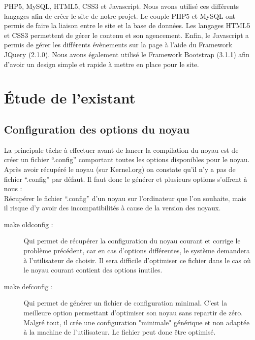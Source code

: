 \documentclass[16pts]{report}
\begin{document}
PHP5, MySQL, HTML5, CSS3 et Javascript. Nous avons utilisé ces différents 
langages afin de créer le site de notre projet. Le couple PHP5 et MySQL 
ont permis de faire la liaison entre le site et la base de données. Les 
langages HTML5 et CSS3 permettent de gérer le contenu et son agencement. 
Enfin, le Javascript a permis de gérer les différents évènements sur la 
page à l'aide du Framework JQuery (2.1.0). Nous avons également utilisé 
le Framework Bootstrap (3.1.1) afin d'avoir un design simple et rapide à 
mettre en place pour le site.
\\

\chapter{Étude de l'existant}
\label{cha:Étude de l'existant}

\section{Configuration des options du noyau}
\label{sec:Configuration des options du noyau}

La principale tâche à effectuer avant de lancer la compilation du noyau est de
créer un fichier “.config” comportant toutes les options disponibles pour le
noyau.  Après avoir récupéré le noyau (sur Kernel.org) on constate qu’il n’y a
pas de fichier “.config” par défaut. Il faut donc le générer et plusieurs
options s’offrent à nous :
\\

Récupérer le fichier “.config” d’un noyau sur l’ordinateur que l’on souhaite,
mais il risque d’y avoir des incompatibilités à cause de la version des noyaux.

\begin{description}
    \item[make oldconfig :] Qui permet de récupérer la configuration du noyau
        courant et corrige le problème précédent, car en cas d’options
        différentes, le système demandera à l’utilisateur de choisir. Il sera
        difficile d’optimiser ce fichier dans le cas où le noyau courant
        contient des options inutiles.

    \item[make defconfig :] Qui permet de générer un fichier de configuration
        minimal. C’est la meilleure option permettant d’optimiser son noyau
        sans repartir de zéro. Malgré tout, il crée une configuration
        "minimale" générique et non adaptée à la machine de l’utilisateur.
        Le fichier peut donc être optimisé.
\end{description}
\end{document}
